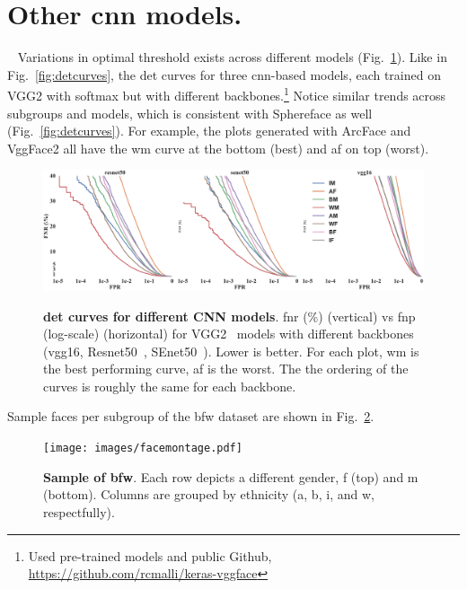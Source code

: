 




% 
\onecolumn
\renewcommand{\thesection}{\alph{section}}
\glsresetall
\setcounter{section}{0}

\section{Other \gls{cnn} models.}~\label{app:sec:other:models}
Variations in optimal threshold exists across different models (Fig.~\ref{fig:sdm-appendix-a}). Like in Fig.~\ref{fig:detcurves}, the \gls{det} curves for three \gls{cnn}-based models, each trained on VGG2 with softmax but with different backbones.\footnote{Used pre-trained models and public Github, \href{https://github.com/rcmalli/keras-vggface}{https://github.com/rcmalli/keras-vggface}} Notice similar trends across subgroups and models, which is consistent with  Sphereface as well (Fig.~\ref{fig:detcurves}). For example, the plots generated with ArcFace and VggFace2 all have the \gls{wm} curve at the bottom (\ie best) and \gls{af} on top (\ie worst).
\begin{figure}[h!]
\vspace{-2mm}
    \centering
    \includegraphics[width=.8\linewidth, trim={0mm 0mm 0mm 0mm},clip]{images/SDM.pdf}\\
    \caption{\textbf{\gls{det} curves for different CNN models}. \gls{fnr} (\%) (vertical) vs \gls{fnp} (log-scale)  (horizontal) for VGG2~\cite{Cao18} models with different backbones (vgg16, Resnet50~\cite{he2016deep}, SEnet50~\cite{hu2018squeeze}). Lower is better. For each plot, \gls{wm} is the best performing curve, \gls{af} is the worst. The the ordering of the curves is roughly the same for each backbone.}\label{fig:sdm-appendix-a}
    \vspace{-3mm}
\end{figure}

Sample faces per subgroup of the \gls{bfw} dataset are shown in Fig.~\ref{fig:montage:app}.
\begin{figure}[h!]
\vspace{-2mm}
    \centering
    \texttt{[image: images/facemontage.pdf]}
    \caption{\textbf{Sample of \gls{bfw}}. Each row depicts a different gender, \gls{f} (top) and \gls{m} (bottom). Columns are grouped by ethnicity (\ie \gls{a}, \gls{b}, \gls{i}, and \gls{w}, respectfully).}
    \label{fig:montage:app}
    \vspace{-3mm}
\end{figure}

